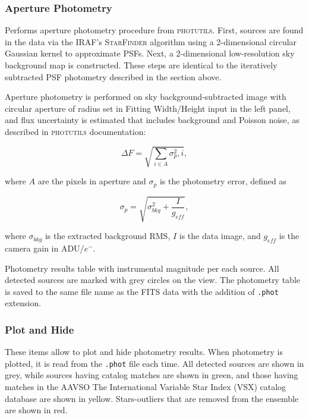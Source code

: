 \documentclass{article}
\begin{document}
\subsubsection{Aperture Photometry}
Performs aperture photometry procedure from \textsc{photutils}. First, sources are found in the data via the IRAF's \textsc{StarFinder} algorithm using a 2-dimensional circular Gaussian kernel to approximate PSFs. Next, a 2-dimensional low-resolution sky background map is constructed. These steps are identical to the iteratively subtracted PSF photometry described in the section above. 

Aperture photometry is performed on sky background-subtracted image with circular aperture of radius set in Fitting Width/Height input in the left panel, and flux uncertainty is estimated that includes background and Poisson noise, as described in \textsc{photutils} documentation: 

\begin{equation}
\Delta F = \sqrt{\sum_{i \in A} \sigma_p^2,i},
\end{equation}

where $A$ are the pixels in aperture and $\sigma_p$ is the photometry error, defined as 

\begin{equation}
\sigma_p = \sqrt{\sigma_{bkg}^2 + \frac{I}{g_{eff}}}, 
\end{equation}

where $\sigma_{bkg}$ is the extracted background RMS, $I$ is the data image, and $g_{eff}$ is the camera gain in ADU/$e^-$. 

Photometry results table with instrumental magnitude per each source. All detected sources are marked with grey circles on the view. The photometry table is saved to the same file name as the FITS data with the addition of \texttt{.phot} extension. 

\subsubsection{Plot and Hide}
These items allow to plot and hide photometry results. When photometry is plotted, it is read from the \texttt{.phot} file each time. All detected sources are shown in grey, while sources having catalog matches are shown in green, and those having matches in the AAVSO The International Variable Star Index (VSX) catalog \citep{2006SASS...25...47W} database are shown in yellow. Stars-outliers that are removed from the ensemble are shown in red.
\end{document}
